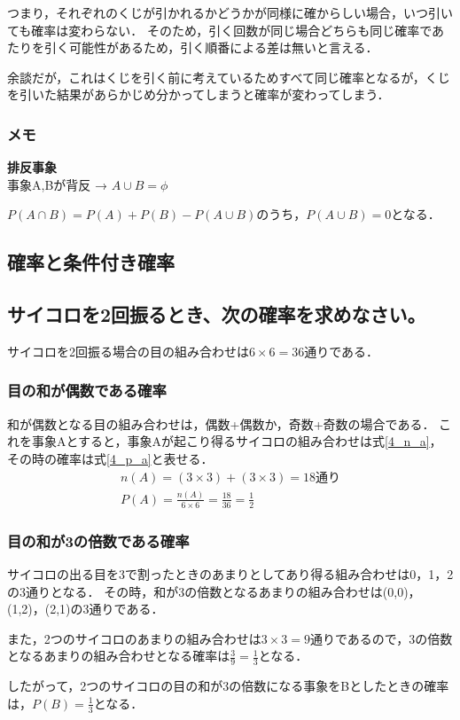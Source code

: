\documentclass[titlepage,a4paper]{jsarticle}
\begin{document}
つまり，それぞれのくじが引かれるかどうかが同様に確からしい場合，いつ引いても確率は変わらない．
そのため，引く回数が同じ場合どちらも同じ確率であたりを引く可能性があるため，引く順番による差は無いと言える．

余談だが，これはくじを引く前に考えているためすべて同じ確率となるが，くじを引いた結果があらかじめ分かってしまうと確率が変わってしまう．

\subsubsection*{メモ}
\textbf{排反事象}\\
事象A,Bが背反 → $A \cup B = \phi $

$P(A \cap B)=P(A)+P(B)-P(A \cup B)$のうち，$P(A\cup B)=0$となる．

\subsection{確率と条件付き確率}
\subsection*{サイコロを2回振るとき、次の確率を求めなさい。}
サイコロを2回振る場合の目の組み合わせは$6 \times 6=36$通りである．
\subsubsection{目の和が偶数である確率}
和が偶数となる目の組み合わせは，偶数+偶数か，奇数+奇数の場合である．
これを事象Aとすると，事象Aが起こり得るサイコロの組み合わせは式\eqref{4_n_a}，その時の確率は式\eqref{4_p_a}と表せる．
\begin{align}
  n(A) = (3 \times 3)+(3 \times 3)=18\text{通り}\label{4_n_a} \\
  P(A) = \frac{n(A)}{6\times6} = \frac{18}{36} = \frac{1}{2}\label{4_p_a}
\end{align}
\subsubsection{目の和が3の倍数である確率}
サイコロの出る目を3で割ったときのあまりとしてあり得る組み合わせは0，1，2の3通りとなる．
その時，和が3の倍数となるあまりの組み合わせは(0,0)，(1,2)，(2,1)の3通りである．

また，2つのサイコロのあまりの組み合わせは$3 \times 3=9$通りであるので，3の倍数となるあまりの組み合わせとなる確率は$\frac{3}{9}=\frac{1}{3}$となる．

したがって，2つのサイコロの目の和が3の倍数になる事象をBとしたときの確率は，$P(B)=\frac{1}{3}$となる．
\end{document}
